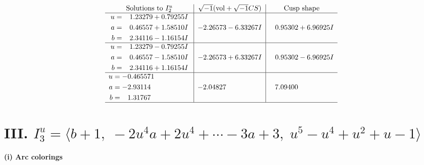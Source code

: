 \documentclass[1p]{elsarticle_modified}
\theoremstyle{definition}
\newcommand{\I}{\sqrt{-1}}
\begin{document}
$$\begin{array}{c|c|c}  
\text{Solutions to }I^u_{2}& \I (\text{vol} + \sqrt{-1}CS) & \text{Cusp shape}\\
 \hline 
\begin{aligned}
u &= \phantom{-}1.23279 + 0.79255 I \\
a &= \phantom{-}0.46557 + 1.58510 I \\
b &= \phantom{-}2.34116 - 1.16154 I\end{aligned}
 & -2.26573 - 6.33267 I & \phantom{-}0.95302 + 6.96925 I \\ \hline\begin{aligned}
u &= \phantom{-}1.23279 - 0.79255 I \\
a &= \phantom{-}0.46557 - 1.58510 I \\
b &= \phantom{-}2.34116 + 1.16154 I\end{aligned}
 & -2.26573 + 6.33267 I & \phantom{-}0.95302 - 6.96925 I \\ \hline\begin{aligned}
u &= -0.465571\phantom{ +0.000000I} \\
a &= -2.93114\phantom{ +0.000000I} \\
b &= \phantom{-}1.31767\phantom{ +0.000000I}\end{aligned}
 & -2.04827\phantom{ +0.000000I} & \phantom{-}7.09400\phantom{ +0.000000I}\\
 \hline 
 \end{array}$$\newpage\newpage\renewcommand{\arraystretch}{1}
\centering \section*{III. $I^u_{3}= \langle b+1,\;-2 u^4 a+2 u^4+\cdots-3 a+3,\;u^5- u^4+u^2+u-1 \rangle$}
\flushleft \textbf{(i) Arc colorings}\\
\end{document}
